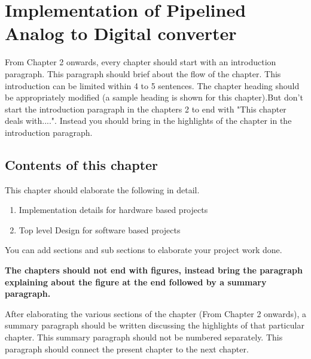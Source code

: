 \chapter{Implementation of Pipelined Analog to Digital converter}

\indent\indent From Chapter 2 onwards, every chapter should start with an introduction paragraph. This paragraph should brief about the flow of the chapter. This introduction can be limited within 4 to 5 sentences. The chapter heading should be appropriately modified (a sample heading is shown for this chapter).But don't start the introduction paragraph in the chapters 2 to end with "This chapter deals with....". Instead you should bring in the highlights of the chapter in the introduction paragraph. 

\section{Contents of this chapter}
This chapter should elaborate the following in detail.
\begin{enumerate}
\item Implementation details for hardware based projects
\item Top level Design for software based projects
\end{enumerate}

You can add sections and sub sections to elaborate your project work done.

\vspace{0.75cm}

 \textbf{The chapters should not end with figures, instead bring the paragraph explaining about the figure at the end followed by a summary paragraph.}

After elaborating the various sections of the chapter (From Chapter 2 onwards), a summary paragraph should be written discussing the highlights of that particular chapter. This summary paragraph should not be numbered separately. This paragraph should connect the present chapter to the next chapter. 


